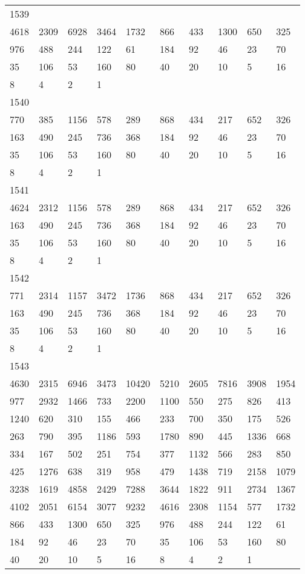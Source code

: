 \begin{longtable}{*{10}{l}}
1539&&&&&&&&&\\
4618& 2309& 6928& 3464& 1732& 866& 433& 1300& 650& 325\\
976& 488& 244& 122& 61& 184& 92& 46& 23& 70\\
35& 106& 53& 160& 80& 40& 20& 10& 5& 16\\
8& 4& 2& 1& \\

1540&&&&&&&&&\\
770& 385& 1156& 578& 289& 868& 434& 217& 652& 326\\
163& 490& 245& 736& 368& 184& 92& 46& 23& 70\\
35& 106& 53& 160& 80& 40& 20& 10& 5& 16\\
8& 4& 2& 1& \\

1541&&&&&&&&&\\
4624& 2312& 1156& 578& 289& 868& 434& 217& 652& 326\\
163& 490& 245& 736& 368& 184& 92& 46& 23& 70\\
35& 106& 53& 160& 80& 40& 20& 10& 5& 16\\
8& 4& 2& 1& \\

1542&&&&&&&&&\\
771& 2314& 1157& 3472& 1736& 868& 434& 217& 652& 326\\
163& 490& 245& 736& 368& 184& 92& 46& 23& 70\\
35& 106& 53& 160& 80& 40& 20& 10& 5& 16\\
8& 4& 2& 1& \\

1543&&&&&&&&&\\
4630& 2315& 6946& 3473& 10420& 5210& 2605& 7816& 3908& 1954\\
977& 2932& 1466& 733& 2200& 1100& 550& 275& 826& 413\\
1240& 620& 310& 155& 466& 233& 700& 350& 175& 526\\
263& 790& 395& 1186& 593& 1780& 890& 445& 1336& 668\\
334& 167& 502& 251& 754& 377& 1132& 566& 283& 850\\
425& 1276& 638& 319& 958& 479& 1438& 719& 2158& 1079\\
3238& 1619& 4858& 2429& 7288& 3644& 1822& 911& 2734& 1367\\
4102& 2051& 6154& 3077& 9232& 4616& 2308& 1154& 577& 1732\\
866& 433& 1300& 650& 325& 976& 488& 244& 122& 61\\
184& 92& 46& 23& 70& 35& 106& 53& 160& 80\\
40& 20& 10& 5& 16& 8& 4& 2& 1& \\


\end{longtable}
